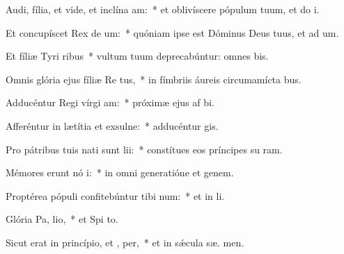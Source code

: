 \item Audi, fília, et vide, et inclína  am:~* et oblivíscere pópulum tuum, et do  i.
\item Et concupíscet Rex de um:~* quóniam ipse est Dóminus Deus tuus, et ad um.
\item Et fíliæ Tyri  ribus~* vultum tuum deprecabúntur: omnes  bis.
\item Omnis glória ejus fíliæ Re  tus,~* in fímbriis áureis circumamícta bus.
\item Adducéntur Regi vírgi  am:~* próximæ ejus af bi.
\item Afferéntur in lætítia et exsulne:~* adducéntur   gis.
\item Pro pátribus tuis nati sunt  lii:~* constítues eos príncipes su  ram.
\item Mémores erunt nó i:~* in omni generatióne et genem.
\item Proptérea pópuli confitebúntur tibi  num:~* et in  li.
\item Glória Pa,  lio,~* et Spi to.
\item Sicut erat in princípio, et ,  per,~* et in sǽcula sæ. men.

